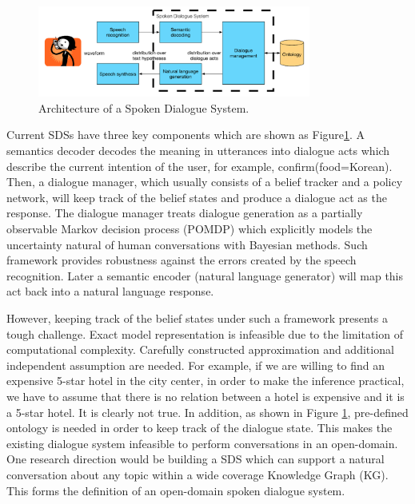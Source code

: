 \documentclass[bsc,frontabs,twoside,singlespacing,parskip,deptreport]{infthesis}     %
\begin{document}
\begin{figure}[h]
    \centering
    \includegraphics[width=0.80\textwidth]{sds.png}
    \caption{Architecture of a Spoken Dialogue System.\cite{gasic}}
    \label{fig:sds}
\end{figure}

Current SDSs have three key components which are shown as Figure\ref{fig:sds}. A semantics decoder decodes the meaning in utterances into dialogue acts which describe the current intention of the user, for example, confirm(food=Korean). Then, a dialogue manager, which usually consists of a belief tracker and a policy network, will keep track of the belief states and produce a dialogue act as the response. The dialogue manager treats dialogue generation as a partially observable Markov decision process (POMDP)\cite{williams2007partially,young2013pomdp,young2010hidden} which explicitly models the uncertainty natural of human conversations with Bayesian methods. Such framework provides robustness against the errors created by the speech recognition. Later a semantic encoder (natural language generator) will map this act back into a natural language response.

However, keeping track of the belief states under such a framework presents a tough challenge. Exact model representation is infeasible due to the limitation of computational complexity\cite{young2013pomdp}. Carefully constructed approximation and additional independent assumption are needed. For example, if we are willing to find an expensive 5-star hotel in the city center, in order to make the inference practical, we have to assume that there is no relation between a hotel is expensive and it is a 5-star hotel. It is clearly not true. In addition, as shown in Figure \ref{fig:sds}, pre-defined ontology is needed in order to keep track of the dialogue state. This makes the existing dialogue system infeasible to perform conversations in an open-domain. One research direction would be building a SDS which can support a natural conversation about any topic within a wide coverage Knowledge Graph (KG). This forms the definition of an open-domain spoken dialogue system\cite{opendomain}.
\end{document}
